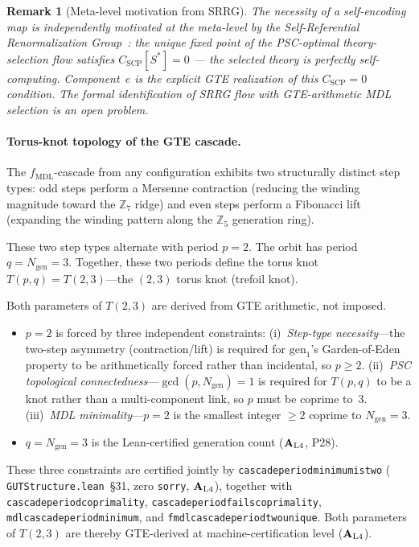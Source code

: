\documentclass[12pt,letterpaper]{article}
\newtheorem{remark}[theorem]{Remark}
\newcommand{\fmdl}{f_{\mathrm{MDL}}}
\newcommand{\Zseven}{\mathbb{Z}_7}
\newcommand{\Zfive}{\mathbb{Z}_5}
\newcommand{\ngen}{N_{\mathrm{gen}}}
\newcommand{\catAL}{\ensuremath{\textbf{A}_{\rm L4}}}
\newcommand{\lean}[1]{%
  \penalty-100
  \begingroup\def\_{\textunderscore\allowbreak}\texttt{#1}\endgroup}
\begin{document}
\begin{remark}[Meta-level motivation from SRRG]
The necessity of a self-encoding map is independently motivated at the meta-level
by the Self-Referential Renormalization Group~\cite{SpivackSRRG}: the unique fixed
point of the PSC-optimal theory-selection flow satisfies $C_{\mathrm{SCP}}[S^*] = 0$
--- the selected theory is perfectly self-computing.  Component~$e$ is the explicit
GTE realization of this $C_{\mathrm{SCP}}=0$ condition.  The formal identification
of SRRG flow with GTE-arithmetic MDL selection is an open problem.
\end{remark}

\paragraph{Torus-knot topology of the GTE cascade.}
The $\fmdl$-cascade from any configuration exhibits two structurally distinct step
types: odd steps perform a Mersenne contraction (reducing the winding magnitude
toward the $\Zseven$ ridge) and even steps perform a Fibonacci lift (expanding the
winding pattern along the $\Zfive$ generation ring).

These two step types alternate with period $p = 2$.  The orbit has period
$q = \ngen = 3$.  Together, these two periods define the torus knot
$T(p,q) = T(2,3)$---the $(2,3)$ torus knot (trefoil knot).

Both parameters of $T(2,3)$ are derived from GTE arithmetic, not imposed.
\begin{itemize}[nosep]
  \item \emph{$p = 2$} is forced by three independent constraints:
        (i)~\emph{Step-type necessity}---the two-step asymmetry
        (contraction/lift) is required for $\mathrm{gen}_1$'s Garden-of-Eden
        property to be arithmetically forced rather than incidental, so
        $p \geq 2$.
        (ii)~\emph{PSC topological connectedness}---$\gcd(p, \ngen) = 1$
        is required for $T(p,q)$ to be a knot rather than a multi-component
        link, so $p$ must be coprime to~3.
        (iii)~\emph{MDL minimality}---$p = 2$ is the smallest integer $\geq 2$
        coprime to $\ngen = 3$.
  \item \emph{$q = \ngen = 3$} is the Lean-certified generation count
        (\catAL, P28).
\end{itemize}
These three constraints are certified jointly by
\lean{cascade\_period\_minimum\_is\_two}
(\lean{GUTStructure.lean}~\S31, zero \texttt{sorry}, \catAL), together with
\lean{cascade\_period\_coprimality},
\lean{cascade\_period\_3\_fails\_coprimality},
\lean{mdl\_cascade\_period\_minimum}, and
\lean{fmdl\_cascade\_period\_two\_unique}.
Both parameters of $T(2,3)$ are thereby GTE-derived at machine-certification
level (\catAL).
\end{document}
